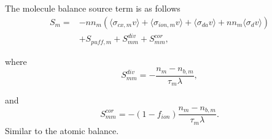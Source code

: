 \documentclass[amsmath,amssymb,a4]{revtex4-2}
\begin{document}
\noindent The molecule balance source term is as follows
\begin{equation}
    \begin{aligned}
    S_m =& -nn_m\left(\langle\sigma_{cx,m} v\rangle + \langle\sigma_{ion,m} v\rangle + \langle\sigma_{da} v\rangle + nn_m\langle\sigma_{d} v\rangle \right) \\
    &+ S_{puff,m}+S^{div}_{mm}+S^{cor}_{mm},
    \end{aligned}
\end{equation}

where 
\begin{equation}
    S_{mm}^{div} = - \frac{n_m-n_{b,m}}{\tau_m\lambda},
\end{equation}

and 
\begin{equation}
    S_{mm}^{cor} = - (1-f_{ion})\frac{n_m-n_{b,m}}{\tau_m\lambda}.
\end{equation}
Similar to the atomic balance.

\end{document}

